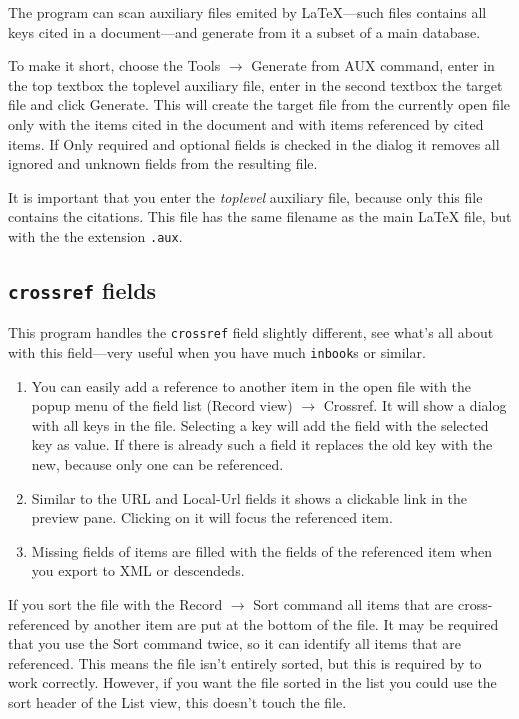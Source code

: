 \documentclass[oneside,10pt]{article}
\newcommand{\command}[1]{\textsf{#1}}
\begin{document}
The program can scan auxiliary files emited by \LaTeX{}---such files contains all
keys cited in a document---and generate from it a subset of a main database.

To make it short, choose the Tools $\rightarrow$ Generate from AUX command, enter in the
top textbox the toplevel auxiliary file, enter in the second textbox the target file
and click Generate. This will create the target file from the currently open file
only with the items cited in the document and with items referenced by cited items.
If \command{Only required and optional fields} is checked in the dialog it removes
all ignored and unknown fields from the resulting file.

It is important that you enter the \emph{toplevel} auxiliary file, because only
this file contains the citations. This file has the same filename as the main \LaTeX{}
file, but with the the extension \verb|.aux|.

\subsection{\texttt{crossref} fields}
\label{sec:CrossrefFields}

This program handles the \verb|crossref| field slightly different, see
\cite[p.~2]{patashnik:1988a} what's all about with this field---very useful when
you have much \verb|inbook|s or similar.
\begin{enumerate}
  \item You can easily add a reference to another item in the open file with the
  popup menu of the field list (Record view) $\rightarrow$ Crossref. It will show
  a dialog with all keys in the file. Selecting a key will add the field with the
  selected key as value. If there is already such a field it replaces the old key
  with the new, because only one can be referenced.
  \item Similar to the URL and Local-Url fields it shows a clickable link in the
  preview pane. Clicking on it will focus the referenced item.
  \item Missing fields of items are filled with the fields of the referenced item
  when you export to XML or descendeds.
\end{enumerate}

If you sort the file with the Record $\rightarrow$ Sort command all items that are
cross-referenced by another item are put at the bottom of the file. It may be required
that you use the Sort command twice, so it can identify all items that are referenced.
This means the file isn't entirely sorted, but this is required by \BibTeX{} to
work correctly. However, if you want the file sorted in the list you could use the
sort header of the List view, this doesn't touch the file.
\end{document}
